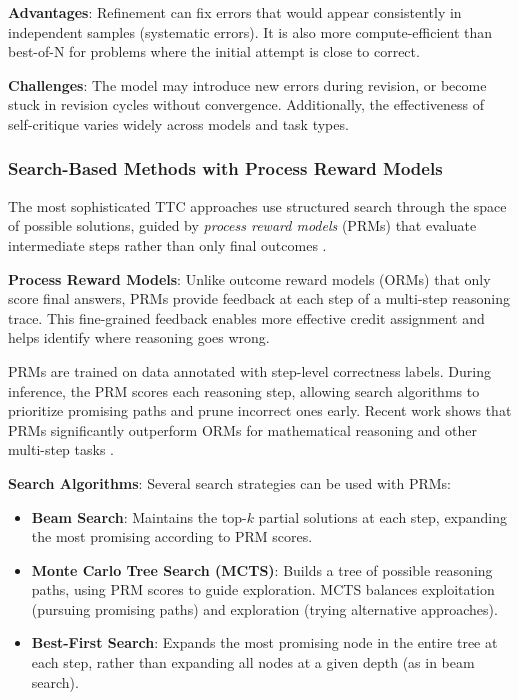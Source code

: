 \textbf{Advantages}: Refinement can fix errors that would appear consistently in independent samples (systematic errors). It is also more compute-efficient than best-of-N for problems where the initial attempt is close to correct.

\textbf{Challenges}: The model may introduce new errors during revision, or become stuck in revision cycles without convergence. Additionally, the effectiveness of self-critique varies widely across models and task types.

\subsubsection{Search-Based Methods with Process Reward Models}

The most sophisticated TTC approaches use structured search through the space of possible solutions, guided by \textit{process reward models} (PRMs) that evaluate intermediate steps rather than only final outcomes \citep{uesato2022prm,arxiv2024prm}.

\textbf{Process Reward Models}: Unlike outcome reward models (ORMs) that only score final answers, PRMs provide feedback at each step of a multi-step reasoning trace. This fine-grained feedback enables more effective credit assignment and helps identify where reasoning goes wrong.

PRMs are trained on data annotated with step-level correctness labels. During inference, the PRM scores each reasoning step, allowing search algorithms to prioritize promising paths and prune incorrect ones early. Recent work shows that PRMs significantly outperform ORMs for mathematical reasoning and other multi-step tasks \citep{lightman2023prm}.

\textbf{Search Algorithms}: Several search strategies can be used with PRMs:

\begin{itemize}
    \item \textbf{Beam Search}: Maintains the top-$k$ partial solutions at each step, expanding the most promising according to PRM scores.
    
    \item \textbf{Monte Carlo Tree Search (MCTS)}: Builds a tree of possible reasoning paths, using PRM scores to guide exploration. MCTS balances exploitation (pursuing promising paths) and exploration (trying alternative approaches).
    
    \item \textbf{Best-First Search}: Expands the most promising node in the entire tree at each step, rather than expanding all nodes at a given depth (as in beam search).
\end{itemize}

